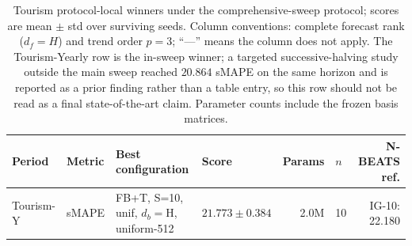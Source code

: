 
\begin{table}[h]
  \caption{Tourism protocol-local winners under the comprehensive-sweep
  protocol; scores are mean $\pm$ std over surviving seeds. Column
  conventions: complete forecast rank ($d_f = H$) and trend order $p = 3$;
  ``---'' means the column does not apply. The Tourism-Yearly row is the
  in-sweep winner; a targeted successive-halving study outside the main
  sweep reached $20.864$ sMAPE on the same horizon and is reported as a
  prior finding rather than a table entry, so this row should not be read
  as a final state-of-the-art claim. Parameter counts include the frozen
  basis matrices.}
  \label{tab:tourism_winners}
  \centering
  \scriptsize
  \setlength{\tabcolsep}{3pt}
  \begin{tabular}{@{}llllrlr@{}}
    \toprule
    Period & Metric & Best configuration & Score & Params & $n$ & N-BEATS ref. \\
    \midrule
    Tourism-Y & sMAPE & FB+T, S=10, unif, $d_b{=}$H, uniform-512 & $21.773 \pm 0.384$ & 2.0M & 10 & IG-10: 22.180 \\
    \bottomrule
  \end{tabular}
\end{table}